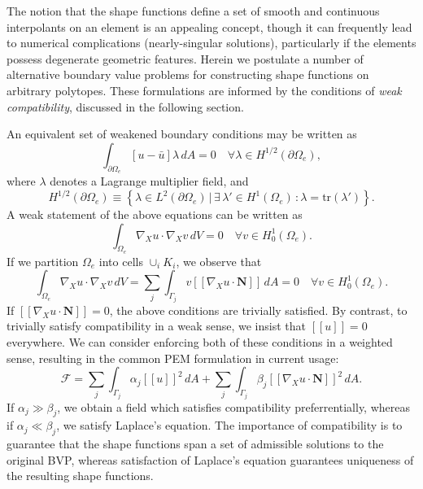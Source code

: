 The notion that the shape functions define a set of smooth and continuous interpolants on an element is an appealing concept, though it can frequently lead to numerical complications (nearly-singular solutions), particularly if the elements possess degenerate geometric features. Herein we postulate a number of alternative boundary value problems for constructing shape functions on arbitrary polytopes. These formulations are informed by the conditions of \textit{weak compatibility}, discussed in the following section.

An equivalent set of weakened boundary conditions may be written as
\begin{equation}
	\int_{\partial \Omega_e} \left[ u - \bar{u} \right] \lambda \, dA = 0 \quad \forall \lambda \in H^{1/2} (\partial \Omega_e),
\end{equation}
where $\lambda$ denotes a Lagrange multiplier field, and
\begin{equation}
	H^{1/2} (\partial \Omega_e) \equiv \left\{ \lambda \in L^2 (\partial \Omega_e) \, | \, \exists \, \lambda' \in H^1 (\Omega_e) \, \colon \lambda = \text{tr} (\lambda') \right\}.
\end{equation}
A weak statement of the above equations can be written as
\begin{equation}
	\int_{\Omega_e} \nabla_X u \cdot \nabla_X v \, dV = 0 \quad \forall v \in H^1_0(\Omega_e).
\end{equation}
If we partition $\Omega_e$ into cells $\cup_i K_i$, we observe that
\begin{equation}
	\int_{\Omega_e} \nabla_X u \cdot \nabla_X v \, dV = \sum_j \int_{\Gamma_j} v [\![ \nabla_X u \cdot \mathbf{N} ]\!] \, dA = 0 \quad \forall v \in H^1_0(\Omega_e).
\end{equation}
If $[\![ \nabla_X u \cdot \mathbf{N} ]\!] = 0$, the above conditions are trivially satisfied. By contrast, to trivially satisfy compatibility in a weak sense, we insist that $[\![ u ]\!] = 0$ everywhere. We can consider enforcing both of these conditions in a weighted sense, resulting in the common PEM formulation in current usage:
\begin{equation}
	\mathcal{F} = \sum_j \int_{\Gamma_j} \alpha_j [\![ u]\!]^2 \, dA + \sum_j \int_{\Gamma_j} \beta_j [\![ \nabla_X u \cdot \mathbf{N} ]\!]^2 \, dA.
\end{equation}
If $\alpha_j \gg \beta_j$, we obtain a field which satisfies compatibility preferrentially, whereas if $\alpha_j \ll \beta_j$, we satisfy Laplace's equation. The importance of compatibility is to guarantee that the shape functions span a set of admissible solutions to the original BVP, whereas satisfaction of Laplace's equation guarantees uniqueness of the resulting shape functions.

